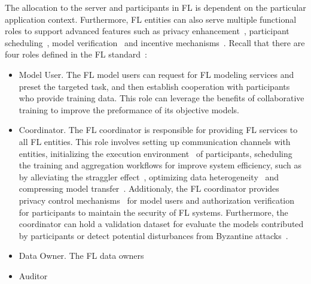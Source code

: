 The allocation to the server and participants in FL is dependent on the particular application context. 
Furthermore, FL entities can also serve multiple functional roles to support advanced features such as privacy enhancement~\cite{geyer2017differentially, bonawitz2017practical}, participant scheduling~\cite{li2022federated, abdulrahman2020fedmccs}, model verification~\cite{tekgul2021waffle, shao2022fedtracker} and incentive mechanisms~\cite{yu2020fairness}.
Recall that there are four roles defined in the FL standard~\cite{IEEEstd3652}:

\begin{itemize}
    \item Model User. The FL model users can request for FL modeling services and preset the targeted task, and then establish cooperation with participants who provide training data. This role can leverage the benefits of collaborative training to improve the preformance of its objective models.
    \item Coordinator. The FL coordinator is responsible for providing FL services to all FL entities. This role involves setting up communication channels with entities, initializing the execution environment~\cite{hanzlik2021mlcapsule} of participants, scheduling the training and aggregation workflows for improve system efficiency, such as by alleviating the straggler effect~\cite{li2021fedsae, chai2020tifl}, optimizing data heterogeneity~\cite{duan2019astraea, abdulrahman2020fedmccs} and compressing model transfer~\cite{konevcny2016federated, sattler2019robust}.
    Additionaly, the FL coordinator provides privacy control mechanisms~\cite{bonawitz2017practical, el2022differential, hesamifard2018privacy} for model users and authorization verification for participants to maintain the security of FL systems. 
    Furthermore, the coordinator can hold a validation dataset for evaluate the models contributed by participants or detect potential disturbances from Byzantine attacks~\cite{sattler2020byzantine}.
    \item Data Owner. The FL data owners
    \item Auditor
\end{itemize}


